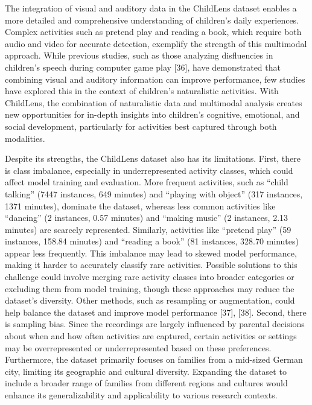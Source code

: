 \documentclass[
  man,floatsintext]{apa6}
\begin{document}
The integration of visual and auditory data in the ChildLens dataset enables a more detailed and comprehensive understanding of children's daily experiences. Complex activities such as pretend play and reading a book, which require both audio and video for accurate detection, exemplify the strength of this multimodal approach. While previous studies, such as those analyzing disfluencies in children's speech during computer game play {[}36{]}, have demonstrated that combining visual and auditory information can improve performance, few studies have explored this in the context of children's naturalistic activities. With ChildLens, the combination of naturalistic data and multimodal analysis creates new opportunities for in-depth insights into children's cognitive, emotional, and social development, particularly for activities best captured through both modalities.

Despite its strengths, the ChildLens dataset also has its limitations. First, there is class imbalance, especially in underrepresented activity classes, which could affect model training and evaluation. More frequent activities, such as ``child talking'' (7447 instances, 649 minutes) and ``playing with object'' (317 instances, 1371 minutes), dominate the dataset, whereas less common activities like ``dancing'' (2 instances, 0.57 minutes) and ``making music'' (2 instances, 2.13 minutes) are scarcely represented. Similarly, activities like ``pretend play'' (59 instances, 158.84 minutes) and ``reading a book'' (81 instances, 328.70 minutes) appear less frequently. This imbalance may lead to skewed model performance, making it harder to accurately classify rare activities. Possible solutions to this challenge could involve merging rare activity classes into broader categories or excluding them from model training, though these approaches may reduce the dataset's diversity. Other methods, such as resampling or augmentation, could help balance the dataset and improve model performance {[}37{]}, {[}38{]}. Second, there is sampling bias. Since the recordings are largely influenced by parental decisions about when and how often activities are captured, certain activities or settings may be overrepresented or underrepresented based on these preferences. Furthermore, the dataset primarily focuses on families from a mid-sized German city, limiting its geographic and cultural diversity. Expanding the dataset to include a broader range of families from different regions and cultures would enhance its generalizability and applicability to various research contexts.
\end{document}
